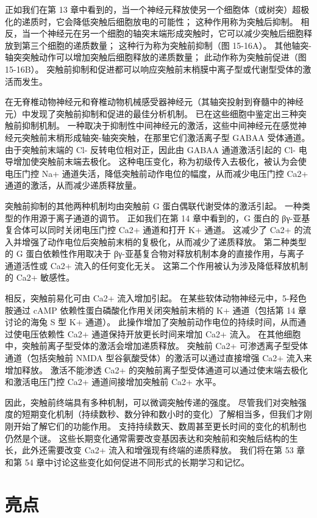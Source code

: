正如我们在第 13 章中看到的，当一个神经元释放使另一个细胞体（或树突）超极化的递质时，它会降低突触后细胞放电的可能性； 这种作用称为突触后抑制。 相反，当一个神经元在另一个细胞的轴突末端形成突触时，它可以减少突触后细胞释放到第三个细胞的递质数量； 这种行为称为突触前抑制（图 15-16A）。 其他轴突-轴突突触动作可以增加突触后细胞释放的递质数量； 此动作称为突触前促进（图 15-16B）。 突触前抑制和促进都可以响应突触前末梢膜中离子型或代谢型受体的激活而发生。


在无脊椎动物神经元和脊椎动物机械感受器神经元（其轴突投射到脊髓中的神经元）中发现了突触前抑制和促进的最佳分析机制。 已在这些细胞中鉴定出三种突触前抑制机制。 一种取决于抑制性中间神经元的激活，这些中间神经元在感觉神经元突触前末梢形成轴突-轴突突触，在那里它们激活离子型 GABAA 受体通道。 由于突触前末端的 Cl- 反转电位相对正，因此由 GABAA 通道激活引起的 Cl- 电导增加使突触前末端去极化。 这种电压变化，称为初级传入去极化，被认为会使电压门控 Na+ 通道失活，降低突触前动作电位的幅度，从而减少电压门控 Ca2+ 通道的激活，从而减少递质释放量。

突触前抑制的其他两种机制均由突触前 G 蛋白偶联代谢受体的激活引起。 一种类型的作用源于离子通道的调节。 正如我们在第 14 章中看到的，G 蛋白的 βγ-亚基复合体可以同时关闭电压门控 Ca2+ 通道和打开 K+ 通道。 这减少了 Ca2+ 的流入并增强了动作电位后突触前末梢的复极化，从而减少了递质释放。 第二种类型的 G 蛋白依赖性作用取决于 βγ-亚基复合物对释放机制本身的直接作用，与离子通道活性或 Ca2+ 流入的任何变化无关。 这第二个作用被认为涉及降低释放机制的 Ca2+ 敏感性。

相反，突触前易化可由 Ca2+ 流入增加引起。 在某些软体动物神经元中，5-羟色胺通过 cAMP 依赖性蛋白磷酸化作用关闭突触前末梢的 K+ 通道（包括第 14 章讨论的海兔 S 型 K+ 通道）。 此操作增加了突触前动作电位的持续时间，从而通过使电压依赖性 Ca2+ 通道保持开放更长时间来增加 Ca2+ 流入。 在其他细胞中，突触前离子型受体的激活会增加递质释放。 突触前 Ca2+ 可渗透离子型受体通道（包括突触前 NMDA 型谷氨酸受体）的激活可以通过直接增强 Ca2+ 流入来增加释放。 激活不能渗透 Ca2+ 的突触前离子型受体通道可以通过使末端去极化和激活电压门控 Ca2+ 通道间接增加突触前 Ca2+ 水平。

因此，突触前终端具有多种机制，可以微调突触传递的强度。 尽管我们对突触强度的短期变化机制（持续数秒、数分钟和数小时的变化）了解相当多，但我们才刚刚开始了解它们的功能作用。 支持持续数天、数周甚至更长时间的变化的机制也仍然是个谜。 这些长期变化通常需要改变基因表达和突触前和突触后结构的生长，此外还需要改变 Ca2+ 流入和增强现有终端的递质释放。 我们将在第 53 章和第 54 章中讨论这些变化如何促进不同形式的长期学习和记忆。


\section{亮点}

